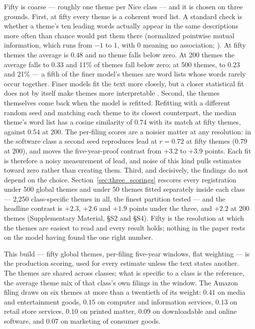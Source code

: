 Fifty is coarse --- roughly one theme per Nice class --- and it is chosen
on three grounds. First, at fifty every theme is a coherent word list. A
standard check is whether a theme's ten leading words actually appear in
the same descriptions more often than chance would put them there
(normalized pointwise mutual information, which runs from $-1$ to $1$, with
$0$ meaning no association; \citealp{Lau2014}). At fifty themes the average
is $0.48$ and no theme falls below zero. At 200 themes the average falls to
$0.33$ and 11\% of themes fall below zero; at 500 themes, to $0.23$ and
21\% --- a fifth of the finer model's themes are word lists whose words
rarely occur together. Finer models fit the text more closely, but a
closer statistical fit does not by itself make themes more interpretable
\citep{Chang2009}. Second, the themes themselves come back when the
model is refitted. Refitting with a different random seed and matching
each theme to its closest counterpart, the median theme's word list has
a cosine similarity of $0.74$ with its match at fifty themes, against
$0.54$ at 200. The per-filing scores are a noisier matter at any
resolution: in the software class a second seed reproduces lead at
$r = 0.72$ at fifty themes ($0.79$ at 200), and moves the five-year-proof
contrast from $+3.2$ to $+3.9$ points. Each fit is therefore a noisy
measurement of lead, and noise of this kind pulls estimates toward zero
rather than creating them. Third, and decisively, the findings do not
depend on the choice. Section~\ref{sec:three_scorings} rescores every
registration under 500 global themes and under 50 themes fitted
separately inside each class --- 2{,}250 class-specific themes in all, the
finest partition tested --- and the headline contrast is $+2.3$, $+2.6$ and
$+1.9$ points under the three, and $+2.2$ at 200 themes (Supplementary
Material, \S S2 and \S S4). Fifty is the resolution at which the themes
are easiest to read and every result holds; nothing in the paper rests on
the model having found the one right number.

This build --- fifty global themes, per-filing five-year windows, flat
weighting --- is the production scoring, used for every estimate unless
the text states another. The themes are shared across classes; what is
specific to a class is the reference, the average theme mix of that
class's own filings in the window. The Amazon filing draws on six themes
at more than a twentieth of its weight: $0.41$ on media and entertainment
goods, $0.15$ on computer and information services, $0.13$ on retail
store services, $0.10$ on printed matter, $0.09$ on downloadable and
online software, and $0.07$ on marketing of consumer goods.

